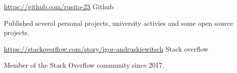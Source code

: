 \documentclass[10pt, a4paper]{resume}
\begin{document}
\begin{cventries}

  \cventry
    {\href{https://github.com/rusito-23}{https://github.com/rusito-23}}
    {Github}
    {}
    {}
    {
      \begin{cvitems}
      \item {Published several personal projects, university activies and some open source projects.}
      \end{cvitems}
    }

  \cventry
    {\href{https://stackoverflow.com/story/igor-andruskiewitsch}{https://stackoverflow.com/story/igor-andruskiewitsch}}
    {Stack overflow}
    {}
    {}
    {
      \begin{cvitems}
        \item {Member of the Stack Overflow community since 2017.}
      \end{cvitems}
    }

\end{cventries}


\end{document}
